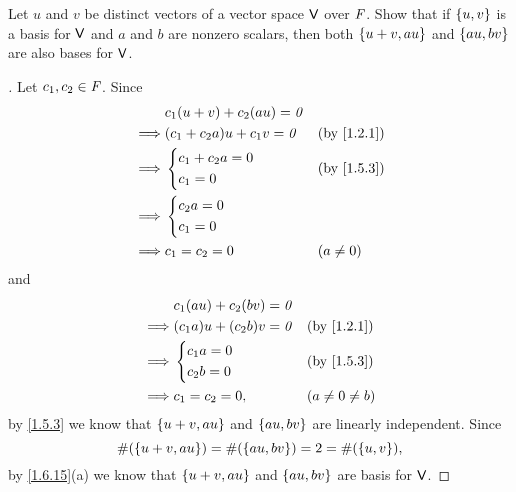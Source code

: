 \exercisesection

\setcounter{ex}{10}
\begin{ex}\label{ex:1.6.11}
  Let \(u\) and \(v\) be distinct vectors of a vector space \(\mathsf{V}\) over \(\mathit{F}\).
  Show that if \(\left\lbrace u, v\right\rbrace\) is a basis for \(\mathsf{V}\) and \(a\) and \(b\) are nonzero scalars, then both \(\left\lbrace u + v, au\right\rbrace\) and \(\left\lbrace au, bv\right\rbrace\) are also bases for \(\mathsf{V}\).
\end{ex}

\begin{proof}[]
  Let \(c_1, c_2 \in \mathit{F}\).
  Since
  \begin{align*}
             & c_1 (u + v) + c_2 (au) = \zv                                \\
    \implies & (c_1 + c_2 a) u + c_1 v = \zv &  & \text{(by \cref{1.2.1})} \\
    \implies & \begin{dcases}
      c_1 + c_2 a = 0 \\
      c_1 = 0
    \end{dcases}    &  & \text{(by \cref{1.5.3})} \\
    \implies & \begin{dcases}
      c_2 a = 0 \\
      c_1 = 0
    \end{dcases}                                  \\
    \implies & c_1 = c_2 = 0                 &  & (a \neq 0)
  \end{align*}
  and
  \begin{align*}
             & c_1 (au) + c_2 (bv) = \zv                                 \\
    \implies & (c_1 a) u + (c_2 b) v = \zv &  & \text{(by \cref{1.2.1})} \\
    \implies & \begin{dcases}
      c_1 a = 0 \\
      c_2 b = 0
    \end{dcases}  &  & \text{(by \cref{1.5.3})} \\
    \implies & c_1 = c_2 = 0,              &  & (a \neq 0 \neq b)
  \end{align*}
  by \cref{1.5.3} we know that \(\left\lbrace u + v, au\right\rbrace\) and \(\left\lbrace au, bv\right\rbrace\) are linearly independent.
  Since
  \[
    \#(\left\lbrace u + v, au\right\rbrace) = \#(\left\lbrace au, bv\right\rbrace) = 2 = \#(\left\lbrace u, v\right\rbrace),
  \]
  by \cref{1.6.15}(a) we know that \(\left\lbrace u + v, au\right\rbrace\) and \(\left\lbrace au, bv\right\rbrace\) are basis for \(\mathsf{V}\).
\end{proof}

